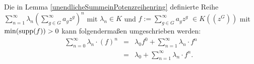 %
%
%
%
%
%
%
%
%
%
%
%
%
%
%
%
%
%
%
%
%
%
%
%
\begin{bem}
Die in Lemma \ref{unendlicheSummeinPotenzreihenring} definierte Reihe $\sum_{n=1}^{\infty}\lambda_n{\left(\sum_{g \in G}^{\infty}a_g z^g\right)}^n$ mit $\lambda_n \in K$ und $f:= \sum_{g \in G}^{\infty}a_g z^g$ $ \in K\left(\left(z^{G}\right)\right)$ mit $\min(\textup{supp}(f)) > 0$ kann folgendermaßen umgeschrieben werden:
\begin{eqnarray*}
\sum_{n=0}^{\infty}\lambda_n\cdot \left(f\right)^n &=& \lambda_0 f^0 + \sum_{n=1}^{\infty}\lambda_n\cdot f^n \\
&=& \lambda_0 + \sum_{n=1}^{\infty}\lambda_n\cdot f^n.
\end{eqnarray*}
%
%
%
%
%
%
\end{bem}
